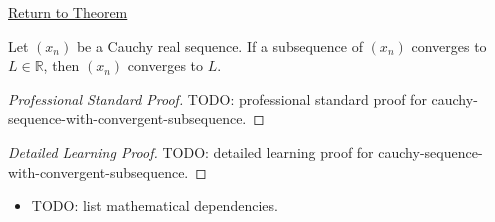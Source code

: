 \newpage
{}
\label{prf:cauchy-convergent-subsequence-converges}

\begin{remark*}[Return]
\hyperref[thm:cauchy-convergent-subsequence-converges]{Return to Theorem}
\end{remark*}

\begin{theorem*}
Let $(x_n)$ be a Cauchy real sequence. If a subsequence of $(x_n)$
converges to $L\in\mathbb{R}$, then $(x_n)$ converges to $L$.

\smallskip
\noindent
\end{theorem*}

\begin{proof}[Professional Standard Proof]
\LRAProofBodyStart
TODO: professional standard proof for cauchy-sequence-with-convergent-subsequence.
\end{proof}

\begin{proof}[Detailed Learning Proof]
\LRAProofBodyStart
TODO: detailed learning proof for cauchy-sequence-with-convergent-subsequence.
\end{proof}

\begin{remark*}
\end{remark*}

\begin{dependencies}
\begin{itemize}
  \item TODO: list mathematical dependencies.
\end{itemize}
\end{dependencies}

\clearpage
